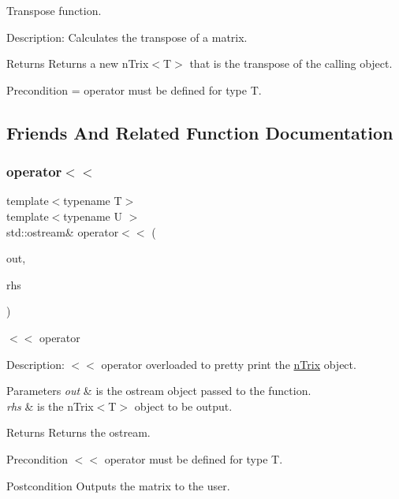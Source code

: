 Transpose function. 

Description\+: Calculates the transpose of a matrix. \begin{DoxyReturn}{Returns}
Returns a new n\+Trix$<$\+T$>$ that is the transpose of the calling object. 
\end{DoxyReturn}
\begin{DoxyPrecond}{Precondition}
= operator must be defined for type T. 
\end{DoxyPrecond}


\subsection{Friends And Related Function Documentation}
\mbox{\label{classnTrix_a3c1676bdc29761ac82a51c65977ca769}} 
\subsubsection{\texorpdfstring{operator$<$$<$}{operator<<}}
{\footnotesize\ttfamily template$<$typename T$>$ \\
template$<$typename U $>$ \\
std\+::ostream\& operator$<$$<$ (\begin{DoxyParamCaption}\item[{std\+::ostream \&}]{out,  }\item[{const \hyperlink{classnTrix}{n\+Trix}$<$ U $>$ \&}]{rhs }\end{DoxyParamCaption})\hspace{0.3cm}{\ttfamily [friend]}}



$<$$<$ operator 

Description\+: $<$$<$ operator overloaded to pretty print the \hyperlink{classnTrix}{n\+Trix} object. 
\begin{DoxyParams}{Parameters}
{\em out} & is the ostream object passed to the function. \\
\hline
{\em rhs} & is the n\+Trix$<$\+T$>$ object to be output. \\
\hline
\end{DoxyParams}
\begin{DoxyReturn}{Returns}
Returns the ostream. 
\end{DoxyReturn}
\begin{DoxyPrecond}{Precondition}
$<$$<$ operator must be defined for type T. 
\end{DoxyPrecond}
\begin{DoxyPostcond}{Postcondition}
Outputs the matrix to the user. 
\end{DoxyPostcond}
\mbox{\label{classnTrix_a08d2697db68d298a32870ce310782313}} 
